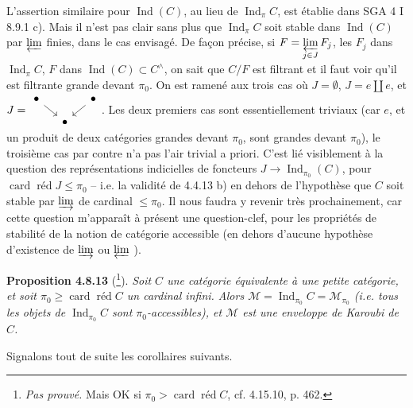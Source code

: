 \documentclass[11pt]{article}
\newcommand{\msp}[1]{\marginpar{\footnotesize [#1]}}
\newcommand{\card}{\operatorname{card}}
\newcommand{\Ind}{\operatorname{Ind}}
\newcommand{\red}{\operatorname{\text{réd}}}
\newcommand{\cM}{\mathcal{M}}
\begin{document}
L'assertion similaire pour $\Ind(C)$, au lieu de $\Ind_{\pi}C$, est établie dans SGA 4 I 8.9.1 c). Mais il n'est pas clair sans plus que $\Ind_{\pi}C$ soit stable dans $\Ind(C)$ par $\varprojlim$ finies, dans le cas envisagé. De façon précise, si $F = \varprojlim\limits_{j\in J} F_j$, les $F_j$ dans $\Ind_{\pi}C$,
\msp{page 212}
$F$ dans $\Ind(C) \subset C^{\wedge}$, on sait que $C/F$ est filtrant et il faut voir qu'il est filtrante grande devant $\pi_0$. On est ramené aux trois cas où $J = \emptyset$, $J = e \amalg e$, et $J = \vcenter{\hbox{\begin{tikzcd}[ampersand replacement=\&, column sep=small, row sep=small]
\bullet \arrow[dr] \& \& \bullet \arrow[dl] \\
\& \bullet \&
\end{tikzcd}}}$. Les deux premiers cas sont essentiellement triviaux (car $e$, et un produit de deux catégories grandes devant $\pi_0$, sont grandes devant $\pi_0$), le troisième cas par contre n'a pas l'air trivial a priori. C'est lié visiblement à la question des représentations indicielles de foncteurs $J \longrightarrow \Ind_{\pi_0}(C)$, pour $\card\red J \leqslant \pi_0$ -- i.e. la validité de 4.4.13 b) en dehors de l'hypothèse que $C$ soit stable par $\varinjlim$ de cardinal $\leqslant \pi_0$. Il nous faudra y revenir très prochainement, car cette question m'apparaît à présent une question-clef, pour les propriétés de stabilité de la notion de catégorie accessible (en dehors d'aucune hypothèse d'existence de $\varinjlim$ ou $\varprojlim$ ). %

\textbf{Proposition 4.8.13} (\footnote[89]{\textit{Pas prouvé.} Mais OK si $\pi_0 > \card\red C$, cf. 4.15.10, p. 462.}). \textit{Soit $C$ une catégorie équivalente à une petite catégorie, et soit $\pi_0 \geqslant \card\red C$ un cardinal infini. Alors $\cM = \Ind_{\pi_0}C = \cM_{\pi_0}$ (i.e. tous les objets de $\Ind_{\pi_0}C$ sont $\pi_0$-accessibles), et $\cM$ est une enveloppe de Karoubi de $C$.}

\msp{page 213}

Signalons tout de suite les corollaires suivants.
\end{document}
